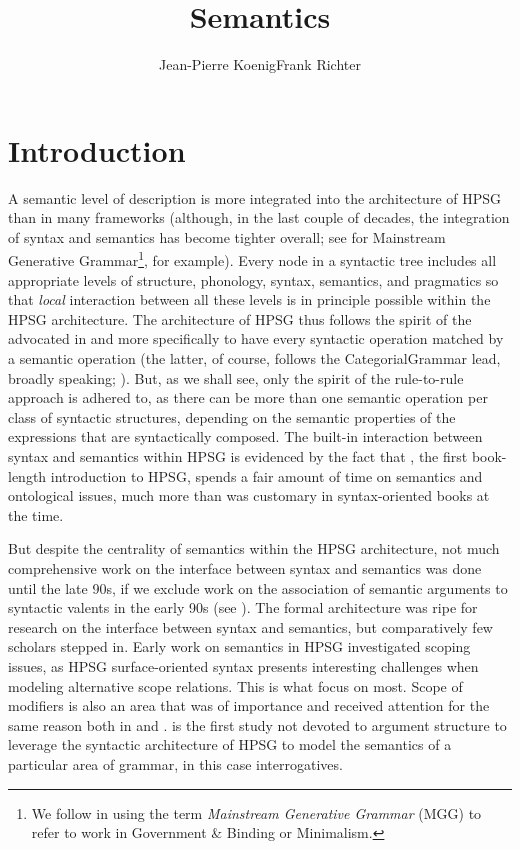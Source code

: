 \documentclass[output=paper,biblatex,babelshorthands,newtxmath,draftmode,colorlinks,citecolor=brown]{langscibook}
\author{Jean-Pierre Koenig\affiliation{University at Buffalo}\lastand Frank Richter\affiliation{Goethe Universität Frankfurt}}
\title{Semantics}
\begin{document}
\maketitle
\label{chap-semantics}

\section{Introduction} 

A semantic level of description is more integrated into the architecture of HPSG
than in many frameworks (although, in the last couple of decades, the integration of syntax and
semantics has become tighter overall; see \citealt{HeimandKratzer1998} for Mainstream Generative
Grammar\footnote{ We follow \citet[]{CJ2005a} in using the term \emph{Mainstream Generative
    Grammar} (MGG) to refer to work in Government \& Binding or Minimalism.}, for example). Every
node in a syntactic tree includes all appropriate levels of structure, phonology, syntax, semantics,
and pragmatics so that \emph{local} interaction between all these levels is in principle possible
within the HPSG architecture. The architecture of HPSG thus follows the spirit of the
 advocated in \citet{Bach1976} and more specifically
\citet{KleinandSag1985} to have every syntactic operation matched by a semantic operation (the
latter, of course, follows the Categorial\indexcg Grammar lead, broadly speaking;
\citealt{Ajdukiewicz35a-u,Pollard84a-u,Steedman2000a-u}). But, as we shall see, only the spirit of
the rule-to-rule approach is adhered to, as there can be more than one semantic operation per class
of syntactic structures, depending on the semantic properties of the expressions that are
syntactically composed. The built-in interaction between syntax and semantics within HPSG is
evidenced by the fact that \citet{PollardandSag1987}, the first book-length introduction to HPSG,
spends a fair amount of time on semantics and ontological issues, much more than was customary in
syntax-oriented books at the time.

But despite the centrality of semantics within the HPSG architecture, not much comprehensive work on
the interface between syntax and semantics was done until the late 90s, if we exclude work on the
association of semantic arguments to syntactic valents in the early 90s (see
). The formal architecture was ripe for research on the interface between
syntax and semantics, but comparatively few scholars stepped in.  Early work on semantics in HPSG
investigated scoping issues, as HPSG surface-oriented syntax presents interesting challenges when
modeling alternative scope relations. This is what \citet{PollardandSag1987, PollardandSag1994}
focus on most. Scope of modifiers is also an area that was of importance and received attention for
the same reason both in \citet{PollardandSag1994} and \citet{Kasper1997}. 
is the first study not devoted to argument structure to leverage the syntactic architecture of HPSG
to model the semantics of a particular area of grammar, in this case interrogatives.
\end{document}

